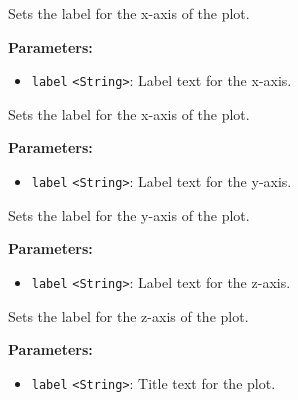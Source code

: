\documentclass[12pt,a4paper]{article}
\begin{document}
\noindent Sets the label for the x-axis of the plot.

\vspace{5mm}
\noindent {}


\noindent \textbf{Parameters:}
\begin{itemize}
  \item \texttt{label} \texttt{<String>}: Label text for the x-axis.
\end{itemize}

\noindent Sets the label for the x-axis of the plot.

\vspace{5mm}
\noindent {}


\noindent \textbf{Parameters:}
\begin{itemize}
  \item \texttt{label} \texttt{<String>}: Label text for the y-axis.
\end{itemize}

\noindent Sets the label for the y-axis of the plot.

\vspace{5mm}
\noindent {}


\noindent \textbf{Parameters:}
\begin{itemize}
  \item \texttt{label} \texttt{<String>}: Label text for the z-axis.
\end{itemize}

\noindent Sets the label for the z-axis of the plot.

\vspace{5mm}
\noindent {}


\noindent \textbf{Parameters:}
\begin{itemize}
  \item \texttt{label} \texttt{<String>}: Title text for the plot.
\end{itemize}
\end{document}
